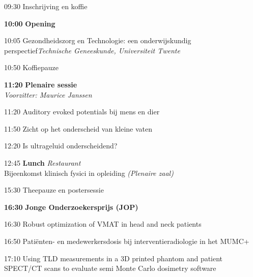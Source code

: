 \documentclass[a4paper,10pt]{report}
\begin{document}
\begin{multicols*}{3}
\begin{packed_enum}
    \item[09:30] Inschrijving en koffie
        \vfill
    \item[\textbf{10:00}] \textbf{Opening}
        \vfill
    \item[10:05] Gezondheidszorg en Technologie: een onderwijskundig perspectief\hfill {\small \textit{Technische Geneeskunde, Universiteit Twente}}
        \vfill
    \item[10:50] Koffiepauze
        \vfill
    \item[\textbf{11:20}] {\textbf{Plenaire sessie}}\\\textit{Voorzitter: Maurice Janssen}
        \item[11:20] Auditory evoked potentials bij mens en dier
        \item[11:50] Zicht op het onderscheid van kleine vaten
        \item[12:20] Is ultrageluid onderscheidend?
        \vfill
    \item[12:45] \textbf{Lunch} \hfill{\small \textit{Restaurant}}\\
        {\small Bijeenkomst klinisch fysici in opleiding \hfill\textit{(Plenaire zaal)}}
        \vfill
    \item[{\color{DarkBlue}{\textbf{14:00}}}]{ }
        \vfill
    \item[15:30] Theepauze en postersessie 
        \vfill
    \item[\textbf{16:30}] {\textbf{Jonge Onderzoekersprijs (JOP)}}\\
    \item[16:30] Robust optimization of VMAT in head and neck patients
    \item[16:50] Patiënten- en medewerkersdosis bij interventieradiologie in het MUMC+
    \item[17:10] Using TLD measurements in a 3D printed phantom and patient SPECT/CT scans to evaluate semi Monte Carlo dosimetry software

\end{packed_enum}
\end{multicols*}
\end{document}
